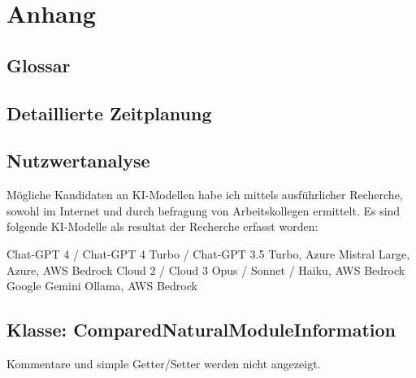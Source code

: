\section{Anhang}

\subsection{Glossar}
\label{app:Glossar}
\printglossaries

\subsection{Detaillierte Zeitplanung}
\label{app:Zeitplanung}



\clearpage



\subsection{Nutzwertanalyse}
\label{app:Nutzwertanalyse}
Mögliche Kandidaten an KI-Modellen habe ich mittels ausführlicher Recherche, sowohl im Internet und durch befragung von Arbeitskollegen ermittelt. Es sind folgende KI-Modelle als resultat der Recherche erfasst worden:

Chat-GPT 4 / Chat-GPT 4 Turbo / Chat-GPT 3.5 Turbo, Azure
Mistral Large, Azure, AWS Bedrock
Cloud 2 / Cloud 3 Opus / Sonnet / Haiku, AWS Bedrock
Google Gemini
Ollama, AWS Bedrock



\subsection{Klasse: ComparedNaturalModuleInformation}
\label{app:CNMI}
Kommentare und simple Getter/Setter werden nicht angezeigt.

\clearpage

